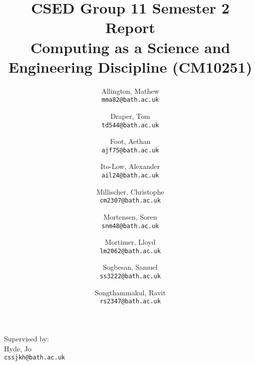 \documentclass[a4paper,10pt]{article}
\title{%
  CSED Group 11 Semester 2 Report \\
  \vspace{0.5em}
  \Large Computing as a Science and Engineering Discipline (CM10251)
}
\author{%
  Allington, Mathew \\
  \texttt{mma82@bath.ac.uk}
  \and
  Draper, Tom \\
  \texttt{td544@bath.ac.uk}
  \and
  Foot, Aethan \\
  \texttt{ajf75@bath.ac.uk}
  \and
  Ito-Low, Alexander \\
  \texttt{ail24@bath.ac.uk}
  \and
  Millischer, Christophe \\
  \texttt{cm2307@bath.ac.uk}
  \and
  Mortensen, Soren \\
  \texttt{snm48@bath.ac.uk}
  \and
  Mortimer, Lloyd \\
  \texttt{lm2062@bath.ac.uk}
  \and
  Sogbesan, Samuel \\
  \texttt{ss3222@bath.ac.uk}
  \and
  Songthammakul, Ravit \\
  \texttt{rs2347@bath.ac.uk}
}
\date{}
\begin{document}
\maketitle
\begin{abstract}
\end{abstract}

\vfill

\begin{center}
  \large Supervised by: \\
  \vspace{0.5em}
  Hyde, Jo \\
  \texttt{cssjkh@bath.ac.uk}
\end{center}

\newpage
\tableofcontents

\newpage
% 
% 
% 
% 


% 

%   
%   
%   
\end{document}
